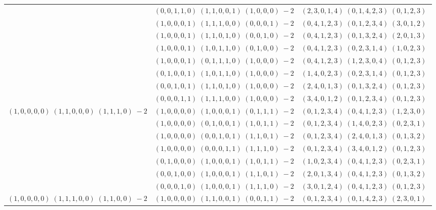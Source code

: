 \documentclass[11pt]{article}
\begin{document}
\begin{longtable}[l]{|c|c|c|}
 \cline{2-3} 
 & $(0 ,0 ,1 ,1 ,0) \;(1 ,1 ,0 ,0 ,1) \;(1 ,0 ,0 ,0) \;-2$ & $(2 ,3 ,0 ,1 ,4) \;(0 ,1 ,4 ,2 ,3) \;(0 ,1 ,2 ,3) \;$\\ 
 \cline{2-3} 
 & $(1 ,0 ,0 ,0 ,1) \;(1 ,1 ,1 ,0 ,0) \;(0 ,0 ,0 ,1) \;-2$ & $(0 ,4 ,1 ,2 ,3) \;(0 ,1 ,2 ,3 ,4) \;(3 ,0 ,1 ,2) \;$\\ 
 \cline{2-3} 
 & $(1 ,0 ,0 ,0 ,1) \;(1 ,1 ,0 ,1 ,0) \;(0 ,0 ,1 ,0) \;-2$ & $(0 ,4 ,1 ,2 ,3) \;(0 ,1 ,3 ,2 ,4) \;(2 ,0 ,1 ,3) \;$\\ 
 \cline{2-3} 
 & $(1 ,0 ,0 ,0 ,1) \;(1 ,0 ,1 ,1 ,0) \;(0 ,1 ,0 ,0) \;-2$ & $(0 ,4 ,1 ,2 ,3) \;(0 ,2 ,3 ,1 ,4) \;(1 ,0 ,2 ,3) \;$\\ 
 \cline{2-3} 
 & $(1 ,0 ,0 ,0 ,1) \;(0 ,1 ,1 ,1 ,0) \;(1 ,0 ,0 ,0) \;-2$ & $(0 ,4 ,1 ,2 ,3) \;(1 ,2 ,3 ,0 ,4) \;(0 ,1 ,2 ,3) \;$\\ 
 \cline{2-3} 
 & $(0 ,1 ,0 ,0 ,1) \;(1 ,0 ,1 ,1 ,0) \;(1 ,0 ,0 ,0) \;-2$ & $(1 ,4 ,0 ,2 ,3) \;(0 ,2 ,3 ,1 ,4) \;(0 ,1 ,2 ,3) \;$\\ 
 \cline{2-3} 
 & $(0 ,0 ,1 ,0 ,1) \;(1 ,1 ,0 ,1 ,0) \;(1 ,0 ,0 ,0) \;-2$ & $(2 ,4 ,0 ,1 ,3) \;(0 ,1 ,3 ,2 ,4) \;(0 ,1 ,2 ,3) \;$\\ 
 \cline{2-3} 
 & $(0 ,0 ,0 ,1 ,1) \;(1 ,1 ,1 ,0 ,0) \;(1 ,0 ,0 ,0) \;-2$ & $(3 ,4 ,0 ,1 ,2) \;(0 ,1 ,2 ,3 ,4) \;(0 ,1 ,2 ,3) \;$\\ \hline\multirow[t]{7}{*}{ $(1 ,0 ,0 ,0 ,0) \;(1 ,1 ,0 ,0 ,0) \;(1 ,1 ,1 ,0) \;-2$ }  & $(1 ,0 ,0 ,0 ,0) \;(1 ,0 ,0 ,0 ,1) \;(0 ,1 ,1 ,1) \;-2$ & $(0 ,1 ,2 ,3 ,4) \;(0 ,4 ,1 ,2 ,3) \;(1 ,2 ,3 ,0) \;$\\ 
 \cline{2-3} 
 & $(1 ,0 ,0 ,0 ,0) \;(0 ,1 ,0 ,0 ,1) \;(1 ,0 ,1 ,1) \;-2$ & $(0 ,1 ,2 ,3 ,4) \;(1 ,4 ,0 ,2 ,3) \;(0 ,2 ,3 ,1) \;$\\ 
 \cline{2-3} 
 & $(1 ,0 ,0 ,0 ,0) \;(0 ,0 ,1 ,0 ,1) \;(1 ,1 ,0 ,1) \;-2$ & $(0 ,1 ,2 ,3 ,4) \;(2 ,4 ,0 ,1 ,3) \;(0 ,1 ,3 ,2) \;$\\ 
 \cline{2-3} 
 & $(1 ,0 ,0 ,0 ,0) \;(0 ,0 ,0 ,1 ,1) \;(1 ,1 ,1 ,0) \;-2$ & $(0 ,1 ,2 ,3 ,4) \;(3 ,4 ,0 ,1 ,2) \;(0 ,1 ,2 ,3) \;$\\ 
 \cline{2-3} 
 & $(0 ,1 ,0 ,0 ,0) \;(1 ,0 ,0 ,0 ,1) \;(1 ,0 ,1 ,1) \;-2$ & $(1 ,0 ,2 ,3 ,4) \;(0 ,4 ,1 ,2 ,3) \;(0 ,2 ,3 ,1) \;$\\ 
 \cline{2-3} 
 & $(0 ,0 ,1 ,0 ,0) \;(1 ,0 ,0 ,0 ,1) \;(1 ,1 ,0 ,1) \;-2$ & $(2 ,0 ,1 ,3 ,4) \;(0 ,4 ,1 ,2 ,3) \;(0 ,1 ,3 ,2) \;$\\ 
 \cline{2-3} 
 & $(0 ,0 ,0 ,1 ,0) \;(1 ,0 ,0 ,0 ,1) \;(1 ,1 ,1 ,0) \;-2$ & $(3 ,0 ,1 ,2 ,4) \;(0 ,4 ,1 ,2 ,3) \;(0 ,1 ,2 ,3) \;$\\ \hline\multirow[t]{11}{*}{ $(1 ,0 ,0 ,0 ,0) \;(1 ,1 ,1 ,0 ,0) \;(1 ,1 ,0 ,0) \;-2$ }  & $(1 ,0 ,0 ,0 ,0) \;(1 ,1 ,0 ,0 ,1) \;(0 ,0 ,1 ,1) \;-2$ & $(0 ,1 ,2 ,3 ,4) \;(0 ,1 ,4 ,2 ,3) \;(2 ,3 ,0 ,1) \;$\\ 

\end{longtable}
\end{document}
